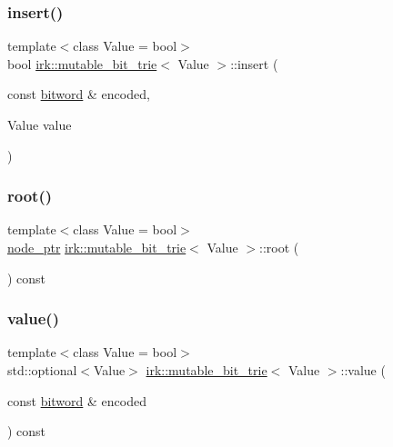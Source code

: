 \subsubsection{\texorpdfstring{insert()}{insert()}\hspace{0.1cm}{\footnotesize\ttfamily [2/2]}}
{\footnotesize\ttfamily template$<$class Value = bool$>$ \\
bool \mbox{\hyperlink{classirk_1_1mutable__bit__trie}{irk\+::mutable\+\_\+bit\+\_\+trie}}$<$ Value $>$\+::insert (\begin{DoxyParamCaption}\item[{const \mbox{\hyperlink{namespaceirk_a979e09720c2ef05573819388a3c0e79a}{bitword}} \&}]{encoded,  }\item[{Value}]{value }\end{DoxyParamCaption})\hspace{0.3cm}{\ttfamily [inline]}}

\mbox{\label{classirk_1_1mutable__bit__trie_a82b109eb8816a4ff9093ca5649d13db9}} 
\subsubsection{\texorpdfstring{root()}{root()}}
{\footnotesize\ttfamily template$<$class Value = bool$>$ \\
\mbox{\hyperlink{classirk_1_1mutable__bit__trie_abd23179ac4f02a981d4f47b4c0652287}{node\+\_\+ptr}} \mbox{\hyperlink{classirk_1_1mutable__bit__trie}{irk\+::mutable\+\_\+bit\+\_\+trie}}$<$ Value $>$\+::root (\begin{DoxyParamCaption}{ }\end{DoxyParamCaption}) const\hspace{0.3cm}{\ttfamily [inline]}}

\mbox{\label{classirk_1_1mutable__bit__trie_ad0bb2e18842b722d7deb1a5d4b72b890}} 
\subsubsection{\texorpdfstring{value()}{value()}}
{\footnotesize\ttfamily template$<$class Value = bool$>$ \\
std\+::optional$<$Value$>$ \mbox{\hyperlink{classirk_1_1mutable__bit__trie}{irk\+::mutable\+\_\+bit\+\_\+trie}}$<$ Value $>$\+::value (\begin{DoxyParamCaption}\item[{const \mbox{\hyperlink{namespaceirk_a979e09720c2ef05573819388a3c0e79a}{bitword}} \&}]{encoded }\end{DoxyParamCaption}) const\hspace{0.3cm}{\ttfamily [inline]}}



